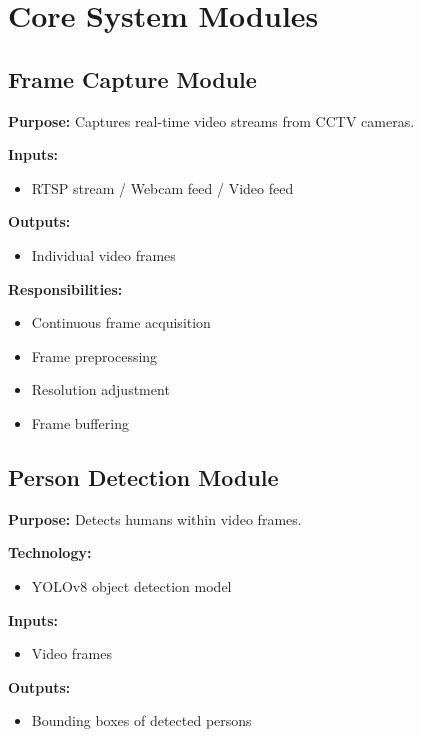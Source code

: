 \documentclass[12pt,a4paper]{article}
\begin{document}
\section{Core System Modules}

\subsection{Frame Capture Module}

\textbf{Purpose:}
Captures real-time video streams from CCTV cameras.

\textbf{Inputs:}
\begin{itemize}
    \item RTSP stream / Webcam feed / Video feed
\end{itemize}

\textbf{Outputs:}
\begin{itemize}
    \item Individual video frames
\end{itemize}

\textbf{Responsibilities:}
\begin{itemize}
    \item Continuous frame acquisition
    \item Frame preprocessing
    \item Resolution adjustment
    \item Frame buffering
\end{itemize}

\subsection{Person Detection Module}

\textbf{Purpose:}
Detects humans within video frames.

\textbf{Technology:}
\begin{itemize}
    \item YOLOv8 object detection model
\end{itemize}

\textbf{Inputs:}
\begin{itemize}
    \item Video frames
\end{itemize}

\textbf{Outputs:}
\begin{itemize}
    \item Bounding boxes of detected persons
\end{itemize}
\end{document}
